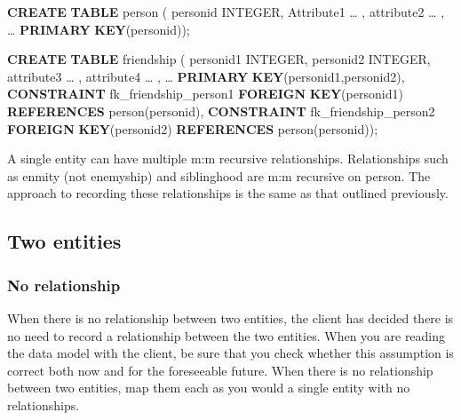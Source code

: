 \documentclass[
]{article}
\newenvironment{Shaded}{\begin{snugshade}}{\end{snugshade}}
\newcommand{\DataTypeTok}[1]{\textcolor[rgb]{0.13,0.29,0.53}{#1}}
\newcommand{\KeywordTok}[1]{\textcolor[rgb]{0.13,0.29,0.53}{\textbf{#1}}}
\newcommand{\NormalTok}[1]{#1}
\begin{document}
\begin{Shaded}
\begin{Highlighting}[]
\KeywordTok{CREATE} \KeywordTok{TABLE}\NormalTok{ person (}
\NormalTok{    personid        }\DataTypeTok{INTEGER}\NormalTok{,}
\NormalTok{    Attribute1      … ,}
\NormalTok{    attribute2      … ,}
\NormalTok{    …}
        \KeywordTok{PRIMARY} \KeywordTok{KEY}\NormalTok{(personid));}
\end{Highlighting}
\end{Shaded}

\begin{Shaded}
\begin{Highlighting}[]
\KeywordTok{CREATE} \KeywordTok{TABLE}\NormalTok{ friendship (}
\NormalTok{    personid1       }\DataTypeTok{INTEGER}\NormalTok{,}
\NormalTok{    personid2       }\DataTypeTok{INTEGER}\NormalTok{,}
\NormalTok{    attribute3      … ,}
\NormalTok{    attribute4      … ,}
\NormalTok{    …}
        \KeywordTok{PRIMARY} \KeywordTok{KEY}\NormalTok{(personid1,personid2),}
        \KeywordTok{CONSTRAINT}\NormalTok{ fk\_friendship\_person1}
            \KeywordTok{FOREIGN} \KeywordTok{KEY}\NormalTok{(personid1) }\KeywordTok{REFERENCES}\NormalTok{ person(personid),}
        \KeywordTok{CONSTRAINT}\NormalTok{ fk\_friendship\_person2}
            \KeywordTok{FOREIGN} \KeywordTok{KEY}\NormalTok{(personid2) }\KeywordTok{REFERENCES}\NormalTok{ person(personid));}
\end{Highlighting}
\end{Shaded}

A single entity can have multiple m:m recursive relationships.
Relationships such as enmity (not enemyship) and siblinghood are m:m
recursive on person. The approach to recording these relationships is
the same as that outlined previously.

\hypertarget{two-entities}{%
\subsection*{Two entities}\label{two-entities}}

\hypertarget{no-relationship}{%
\subsubsection*{No relationship}\label{no-relationship}}

When there is no relationship between two entities, the client has
decided there is no need to record a relationship between the two
entities. When you are reading the data model with the client, be sure
that you check whether this assumption is correct both now and for the
foreseeable future. When there is no relationship between two entities,
map them each as you would a single entity with no relationships.
\end{document}
